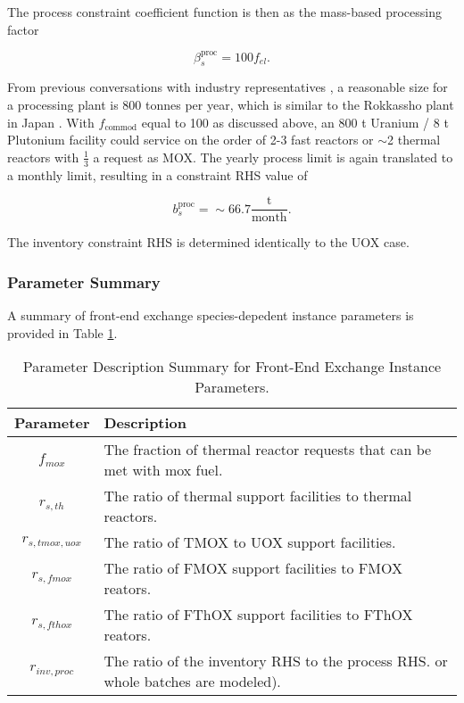 The process constraint coefficient function is then as the mass-based processing
factor

\begin{equation}
\beta^{\text{proc}}_s = 100 f_{el}. 
\end{equation}

From previous conversations with industry representatives \cite{murraycomm}, a
reasonable size for a processing plant is 800 tonnes per year, which is similar
to the Rokkassho plant in Japan \cite{heinonen2010}. With $f_{\text{commod}}$
equal to 100 as discussed above, an 800 t Uranium / 8 t Plutonium facility could
service on the order of 2-3 fast reactors or $\sim$2 thermal reactors with
$\frac{1}{3}$ a request as MOX. The yearly process limit is again translated to
a monthly limit, resulting in a constraint RHS value of

\begin{equation}
b^{\text{proc}}_s = \sim 66.7 \frac{\text{t}}{\text{month}}.
\end{equation}

The inventory constraint RHS is determined identically to the UOX case.

\subsubsection{Parameter Summary}\label{method:setup:front:sum}

A summary of front-end exchange species-depedent instance parameters is provided
in Table \ref{tbl:front_params}.

\begin{table}[h]
\centering
\caption{Parameter Description Summary for Front-End Exchange Instance Parameters.}
\label{tbl:front_params}
\begin{tabularx}{\columnwidth-10pt}{|c|X|} %
\hline
Parameter    & 
Description
\\ \hline
$f_{mox}$     & 
The fraction of thermal reactor requests that can be met with mox fuel.
\\ \hline
$r_{s, th}$ & 
The ratio of thermal support facilities to thermal reactors.  
\\ \hline
$r_{s, tmox, uox}$ & 
The ratio of TMOX to UOX support facilities.
\\ \hline
$r_{s, fmox}$ & 
The ratio of FMOX support facilities to FMOX reators.
\\ \hline
$r_{s, fthox}$ & 
The ratio of FThOX support facilities to FThOX reators.
\\ \hline
$r_{inv, proc}$   & 
The ratio of the inventory RHS to the process RHS.
or whole batches are modeled).  
\\ \hline
\end{tabularx}
\end{table}

